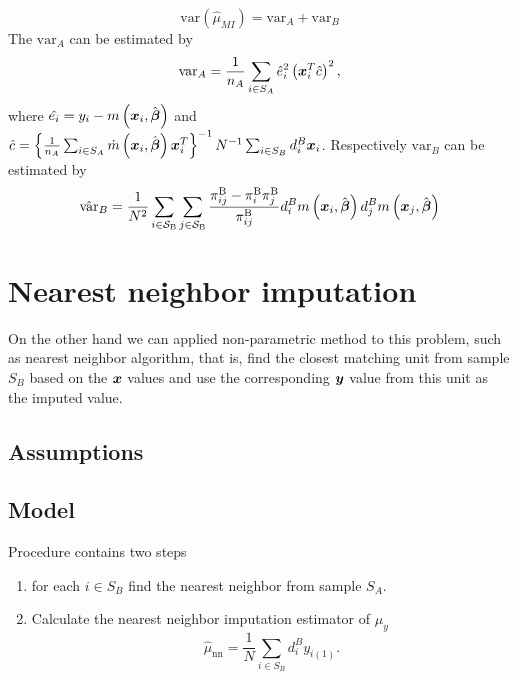 \documentclass[
  letterpaper,
  DIV=11,
  numbers=noendperiod]{scrreprt}
\begin{document}
\[
\text{var}\left(\hat{\mu}_{MI}\right) = \text{var}_A + \text{var}_B 
\] The \(\text{var}_A\) can be estimated by \[
\text{var}_A = \frac{1}{n_A} \sum_{i \in S_A} \hat{e}_i^2 \left(\boldsymbol{x}_i^{T} \hat{c}\right)^2,
\] where
\(\hat{e_i} = y_i - m\left(\boldsymbol{x}_i, \hat{\boldsymbol{\beta}}\right)\) and
\(\hat{c} = \left\{\frac{1}{n_A} \sum_{i \in S_A} \dot{m}\left(\boldsymbol{x}_i, \hat{\boldsymbol{\beta}}\right) \boldsymbol{x}_i^T \right\}^{-1} N^{-1} \sum_{i \in S_B} d_i^B \boldsymbol{x}_i\).
Respectively \(\text{var}_B\) can be estimated by \[
\hat{\text{var}}_B = \frac{1}{N^2} \sum_{i \in \mathcal{S}_{\mathrm{B}}} \sum_{j \in \mathcal{S}_{\mathrm{B}}} \frac{\pi_{i j}^{\mathrm{B}}-\pi_i^{\mathrm{B}} \pi_j^{\mathrm{B}}}{\pi_{i j}^{\mathrm{B}}} d_i^B m\left(\boldsymbol{x}_i, \hat{\boldsymbol{\beta}}\right) d_j^B m\left(\boldsymbol{x}_j, \hat{\boldsymbol{\beta}}\right)
\]

\hypertarget{nearest-neighbor-imputation}{%
\section{Nearest neighbor
imputation}\label{nearest-neighbor-imputation}}

On the other hand we can applied non-parametric method to this problem,
such as nearest neighbor algorithm, that is, find the closest matching
unit from sample \(S_B\) based on the \(\boldsymbol{x}\) values and use the
corresponding \(\boldsymbol{y}\) value from this unit as the imputed value.

\hypertarget{assumptions}{%
\subsection{Assumptions}\label{assumptions}}

\hypertarget{model}{%
\subsection{Model}\label{model}}

Procedure contains two steps

\begin{enumerate}
\def\labelenumi{\arabic{enumi}.}
\item
  for each \(i \in S_B\) find the nearest neighbor from sample \(S_A\).
\item
  Calculate the nearest neighbor imputation estimator of \(\mu_y\) \[
  \begin{equation}
  \hat{\mu}_\mathrm{nn}=\frac{1}{N} \sum_{i \in S_B} d_i^B y_{i(1)} .
  \end{equation}
  \]
\end{enumerate}
\end{document}
